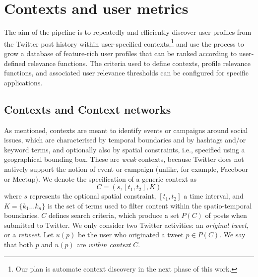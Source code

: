 \section{Contexts and user metrics}


The aim of the pipeline is to repeatedly and efficiently discover user profiles from the Twitter post history within user-specified contexts,\footnote{Our plan is automate context discovery in the next phase of this work.} and use the process to grow a database of feature-rich user profiles that can be ranked according to user-defined relevance functions. 
The criteria used to define contexts, profile relevance functions, and associated user relevance thresholds can be configured for specific applications.

\subsection{Contexts and Context networks} \label{sec:contexts}

As mentioned, contexts are meant to identify events or campaigns around social issues, which are characterised by temporal boundaries and by hashtags and/or keyword terms, and optionally also by spatial constraints, i.e., specified using a geographical bounding box.
These are \textit{weak} contexts, because Twitter does not natively support the notion of event or campaign (unlike, for example, Faceboor or Meetup).
We denote the specification of a generic context as 
\begin{equation}
C = ( s, [t_1, t_2], K )
\label{eq:context}
\end{equation}
where $s$ represents the optional spatial constraint, $[t_1, t_2]$ a time interval, and $K = \{ k_1 \dots k_n\}$ is the set of terms used to filter content within the spatio-temporal boundaries.
%
$C$ defines search criteria, which produce a set $P(C)$ of posts when submitted to Twitter.
We only consider two Twitter activities: an \textit{original tweet}, or a \textit{retweet}.
Let $u(p)$ be the user who originated a tweet $p \in P(C)$.
We say that both $p$ and $u(p)$ are \textit{within context} $C$.

